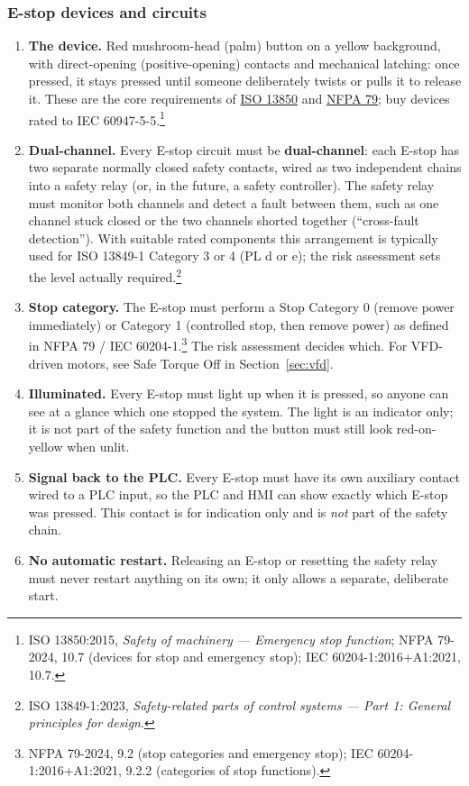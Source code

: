 \subsubsection*{E-stop devices and circuits}
\begin{enumerate}[itemsep=2pt]
  \item \textbf{The device.} Red mushroom-head (palm) button on a yellow background, with direct-opening (positive-opening) contacts and mechanical latching: once pressed, it stays pressed until someone deliberately twists or pulls it to release it. These are the core requirements of \href{https://machinerysafety101.com/2026/05/18/iso-13850-emergency-stop-requirements/}{ISO 13850} and \href{https://link.nfpa.org/all-publications/79/2024}{NFPA 79}; buy devices rated to IEC 60947-5-5.\footnote{ISO 13850:2015, \emph{Safety of machinery --- Emergency stop function}; NFPA 79-2024, 10.7 (devices for stop and emergency stop); IEC 60204-1:2016+A1:2021, 10.7.}
  \item \textbf{Dual-channel.} Every E-stop circuit must be \textbf{dual-channel}: each E-stop has two separate normally closed safety contacts, wired as two independent chains into a safety relay (or, in the future, a safety controller). The safety relay must monitor both channels and detect a fault between them, such as one channel stuck closed or the two channels shorted together (``cross-fault detection''). With suitable rated components this arrangement is typically used for ISO 13849-1 Category 3 or 4 (PL d or e); the risk assessment sets the level actually required.\footnote{ISO 13849-1:2023, \emph{Safety-related parts of control systems --- Part 1: General principles for design}.}
  \item \textbf{Stop category.} The E-stop must perform a Stop Category 0 (remove power immediately) or Category 1 (controlled stop, then remove power) as defined in NFPA 79 / IEC 60204-1.\footnote{NFPA 79-2024, 9.2 (stop categories and emergency stop); IEC 60204-1:2016+A1:2021, 9.2.2 (categories of stop functions).} The risk assessment decides which. For VFD-driven motors, see Safe Torque Off in Section~\ref{sec:vfd}.
  \item \textbf{Illuminated.} Every E-stop must light up when it is pressed, so anyone can see at a glance which one stopped the system. The light is an indicator only; it is not part of the safety function and the button must still look red-on-yellow when unlit.
  \item \textbf{Signal back to the PLC.} Every E-stop must have its own auxiliary contact wired to a PLC input, so the PLC and HMI can show exactly which E-stop was pressed. This contact is for indication only and is \emph{not} part of the safety chain.
  \item \textbf{No automatic restart.} Releasing an E-stop or resetting the safety relay must never restart anything on its own; it only allows a separate, deliberate start.
\end{enumerate}

